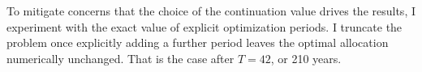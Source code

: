 To mitigate concerns that the choice of the continuation value drives the results, I experiment with the exact value of explicit optimization periods. I truncate the problem once explicitly adding a further period leaves the optimal allocation numerically unchanged. That is the case after $T=42$, or 210 years. %


